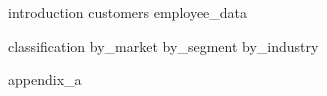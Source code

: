 \documentclass[man]{apa7}
\begin{document}
\maketitle

{introduction}
{customers}
{employee_data}


{classification}
{by_market}
{by_segment}
{by_industry}


\printbibliography
\appendix
{appendix_a}
\end{document}
